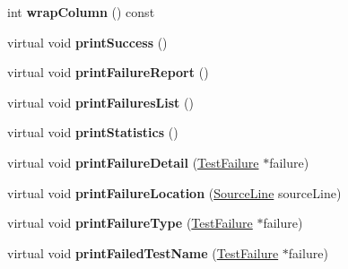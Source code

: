 \begin{DoxyCompactItemize}
\item 
\hypertarget{class_compiler_outputter_a44a670371d545db99603ce88b59aa6c0}{int {\bfseries wrap\+Column} () const }\label{class_compiler_outputter_a44a670371d545db99603ce88b59aa6c0}

\item 
\hypertarget{class_compiler_outputter_a6c4ef0c2857dfeb5f479c686eb7d5e3f}{virtual void {\bfseries print\+Success} ()}\label{class_compiler_outputter_a6c4ef0c2857dfeb5f479c686eb7d5e3f}

\item 
\hypertarget{class_compiler_outputter_a8048313886c1973607947fb774cdf59a}{virtual void {\bfseries print\+Failure\+Report} ()}\label{class_compiler_outputter_a8048313886c1973607947fb774cdf59a}

\item 
\hypertarget{class_compiler_outputter_a0f9bd644d98a3c1d2aec715682cbeacb}{virtual void {\bfseries print\+Failures\+List} ()}\label{class_compiler_outputter_a0f9bd644d98a3c1d2aec715682cbeacb}

\item 
\hypertarget{class_compiler_outputter_abe9c5f783aab2c70dbf3364ce8525dba}{virtual void {\bfseries print\+Statistics} ()}\label{class_compiler_outputter_abe9c5f783aab2c70dbf3364ce8525dba}

\item 
\hypertarget{class_compiler_outputter_a491cf42481e608d3f7966b6433d2ea3c}{virtual void {\bfseries print\+Failure\+Detail} (\hyperlink{class_test_failure}{Test\+Failure} $\ast$failure)}\label{class_compiler_outputter_a491cf42481e608d3f7966b6433d2ea3c}

\item 
\hypertarget{class_compiler_outputter_a805b3dc5c42caa6f133a84d0af89ea6e}{virtual void {\bfseries print\+Failure\+Location} (\hyperlink{class_source_line}{Source\+Line} source\+Line)}\label{class_compiler_outputter_a805b3dc5c42caa6f133a84d0af89ea6e}

\item 
\hypertarget{class_compiler_outputter_a8234687867ed8ac5738f84755c916c9b}{virtual void {\bfseries print\+Failure\+Type} (\hyperlink{class_test_failure}{Test\+Failure} $\ast$failure)}\label{class_compiler_outputter_a8234687867ed8ac5738f84755c916c9b}

\item 
\hypertarget{class_compiler_outputter_a686e9f803d7a9d7d23d34698c168de39}{virtual void {\bfseries print\+Failed\+Test\+Name} (\hyperlink{class_test_failure}{Test\+Failure} $\ast$failure)}\label{class_compiler_outputter_a686e9f803d7a9d7d23d34698c168de39}


\end{DoxyCompactItemize}
